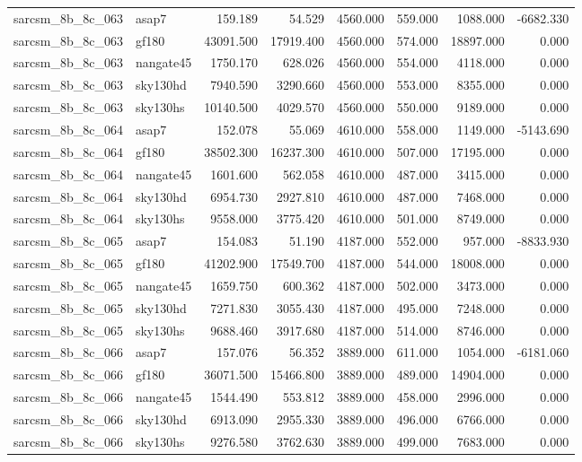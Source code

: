 \begin{tabular}{llrrrrrr}
sarcsm\_8b\_8c\_063 & asap7 & 159.189 & 54.529 & 4560.000 & 559.000 & 1088.000 & -6682.330 \\
sarcsm\_8b\_8c\_063 & gf180 & 43091.500 & 17919.400 & 4560.000 & 574.000 & 18897.000 & 0.000 \\
sarcsm\_8b\_8c\_063 & nangate45 & 1750.170 & 628.026 & 4560.000 & 554.000 & 4118.000 & 0.000 \\
sarcsm\_8b\_8c\_063 & sky130hd & 7940.590 & 3290.660 & 4560.000 & 553.000 & 8355.000 & 0.000 \\
sarcsm\_8b\_8c\_063 & sky130hs & 10140.500 & 4029.570 & 4560.000 & 550.000 & 9189.000 & 0.000 \\
sarcsm\_8b\_8c\_064 & asap7 & 152.078 & 55.069 & 4610.000 & 558.000 & 1149.000 & -5143.690 \\
sarcsm\_8b\_8c\_064 & gf180 & 38502.300 & 16237.300 & 4610.000 & 507.000 & 17195.000 & 0.000 \\
sarcsm\_8b\_8c\_064 & nangate45 & 1601.600 & 562.058 & 4610.000 & 487.000 & 3415.000 & 0.000 \\
sarcsm\_8b\_8c\_064 & sky130hd & 6954.730 & 2927.810 & 4610.000 & 487.000 & 7468.000 & 0.000 \\
sarcsm\_8b\_8c\_064 & sky130hs & 9558.000 & 3775.420 & 4610.000 & 501.000 & 8749.000 & 0.000 \\
sarcsm\_8b\_8c\_065 & asap7 & 154.083 & 51.190 & 4187.000 & 552.000 & 957.000 & -8833.930 \\
sarcsm\_8b\_8c\_065 & gf180 & 41202.900 & 17549.700 & 4187.000 & 544.000 & 18008.000 & 0.000 \\
sarcsm\_8b\_8c\_065 & nangate45 & 1659.750 & 600.362 & 4187.000 & 502.000 & 3473.000 & 0.000 \\
sarcsm\_8b\_8c\_065 & sky130hd & 7271.830 & 3055.430 & 4187.000 & 495.000 & 7248.000 & 0.000 \\
sarcsm\_8b\_8c\_065 & sky130hs & 9688.460 & 3917.680 & 4187.000 & 514.000 & 8746.000 & 0.000 \\
sarcsm\_8b\_8c\_066 & asap7 & 157.076 & 56.352 & 3889.000 & 611.000 & 1054.000 & -6181.060 \\
sarcsm\_8b\_8c\_066 & gf180 & 36071.500 & 15466.800 & 3889.000 & 489.000 & 14904.000 & 0.000 \\
sarcsm\_8b\_8c\_066 & nangate45 & 1544.490 & 553.812 & 3889.000 & 458.000 & 2996.000 & 0.000 \\
sarcsm\_8b\_8c\_066 & sky130hd & 6913.090 & 2955.330 & 3889.000 & 496.000 & 6766.000 & 0.000 \\
sarcsm\_8b\_8c\_066 & sky130hs & 9276.580 & 3762.630 & 3889.000 & 499.000 & 7683.000 & 0.000 \\

\end{tabular}
